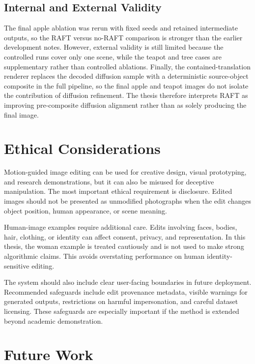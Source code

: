 \subsection{Internal and External Validity}

The final apple ablation was rerun with fixed seeds and retained intermediate outputs, so the RAFT versus no-RAFT comparison is stronger than the earlier development notes. However, external validity is still limited because the controlled runs cover only one scene, while the teapot and tree cases are supplementary rather than controlled ablations. Finally, the contained-translation renderer replaces the decoded diffusion sample with a deterministic source-object composite in the full pipeline, so the final apple and teapot images do not isolate the contribution of diffusion refinement. The thesis therefore interprets RAFT as improving pre-composite diffusion alignment rather than as solely producing the final image.

\section{Ethical Considerations}

Motion-guided image editing can be used for creative design, visual prototyping, and research demonstrations, but it can also be misused for deceptive manipulation. The most important ethical requirement is disclosure. Edited images should not be presented as unmodified photographs when the edit changes object position, human appearance, or scene meaning.

Human-image examples require additional care. Edits involving faces, bodies, hair, clothing, or identity can affect consent, privacy, and representation. In this thesis, the woman example is treated cautiously and is not used to make strong algorithmic claims. This avoids overstating performance on human identity-sensitive editing.

The system should also include clear user-facing boundaries in future deployment. Recommended safeguards include edit provenance metadata, visible warnings for generated outputs, restrictions on harmful impersonation, and careful dataset licensing. These safeguards are especially important if the method is extended beyond academic demonstration.

\section{Future Work}

